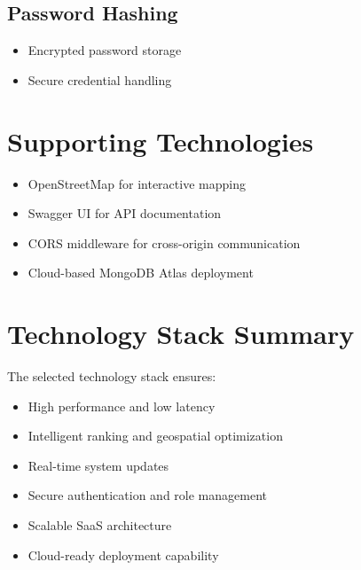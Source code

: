 \documentclass[12pt,a4paper]{report}
\begin{document}
\subsection*{Password Hashing}

\begin{itemize}

\item Encrypted password storage

\item Secure credential handling

\end{itemize}

\section{Supporting Technologies}

\begin{itemize}

\item OpenStreetMap for interactive mapping

\item Swagger UI for API documentation

\item CORS middleware for cross-origin communication

\item Cloud-based MongoDB Atlas deployment

\end{itemize}

\section{Technology Stack Summary}

The selected technology stack ensures:

\begin{itemize}

\item High performance and low latency

\item Intelligent ranking and geospatial optimization

\item Real-time system updates

\item Secure authentication and role management

\item Scalable SaaS architecture

\item Cloud-ready deployment capability

\end{itemize}
\end{document}
